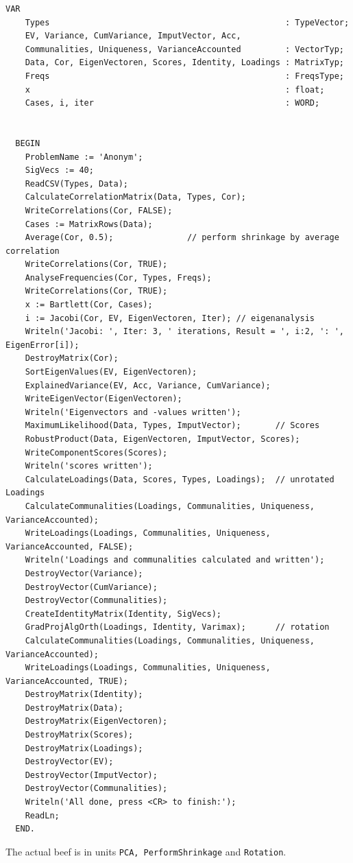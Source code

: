 \begin{refsection}
\begin{lstlisting}[caption=Main program for PCA]
  VAR
    Types                                                : TypeVector;
    EV, Variance, CumVariance, ImputVector, Acc,
    Communalities, Uniqueness, VarianceAccounted         : VectorTyp;
    Data, Cor, EigenVectoren, Scores, Identity, Loadings : MatrixTyp;
    Freqs                                                : FreqsType;
    x                                                    : float;
    Cases, i, iter                                       : WORD;


  BEGIN
    ProblemName := 'Anonym';
    SigVecs := 40;
    ReadCSV(Types, Data);
    CalculateCorrelationMatrix(Data, Types, Cor);
    WriteCorrelations(Cor, FALSE);
    Cases := MatrixRows(Data);
    Average(Cor, 0.5);               // perform shrinkage by average correlation
    WriteCorrelations(Cor, TRUE);
    AnalyseFrequencies(Cor, Types, Freqs);
    WriteCorrelations(Cor, TRUE);
    x := Bartlett(Cor, Cases);
    i := Jacobi(Cor, EV, EigenVectoren, Iter); // eigenanalysis
    Writeln('Jacobi: ', Iter: 3, ' iterations, Result = ', i:2, ': ', EigenError[i]);
    DestroyMatrix(Cor);
    SortEigenValues(EV, EigenVectoren);
    ExplainedVariance(EV, Acc, Variance, CumVariance);
    WriteEigenVector(EigenVectoren);
    Writeln('Eigenvectors and -values written');
    MaximumLikelihood(Data, Types, ImputVector);       // Scores
    RobustProduct(Data, EigenVectoren, ImputVector, Scores);
    WriteComponentScores(Scores);
    Writeln('scores written');
    CalculateLoadings(Data, Scores, Types, Loadings);  // unrotated Loadings
    CalculateCommunalities(Loadings, Communalities, Uniqueness, VarianceAccounted);
    WriteLoadings(Loadings, Communalities, Uniqueness, VarianceAccounted, FALSE);
    Writeln('Loadings and communalities calculated and written');
    DestroyVector(Variance);
    DestroyVector(CumVariance);
    DestroyVector(Communalities);
    CreateIdentityMatrix(Identity, SigVecs);
    GradProjAlgOrth(Loadings, Identity, Varimax);      // rotation
    CalculateCommunalities(Loadings, Communalities, Uniqueness, VarianceAccounted);
    WriteLoadings(Loadings, Communalities, Uniqueness, VarianceAccounted, TRUE);
    DestroyMatrix(Identity);
    DestroyMatrix(Data);
    DestroyMatrix(EigenVectoren);
    DestroyMatrix(Scores);
    DestroyMatrix(Loadings);
    DestroyVector(EV);
    DestroyVector(ImputVector);
    DestroyVector(Communalities);
    Writeln('All done, press <CR> to finish:');
    ReadLn;
  END.
\end{lstlisting}

The actual beef is in units \texttt{PCA, PerformShrinkage} and \texttt{Rotation}.


\end{refsection}
